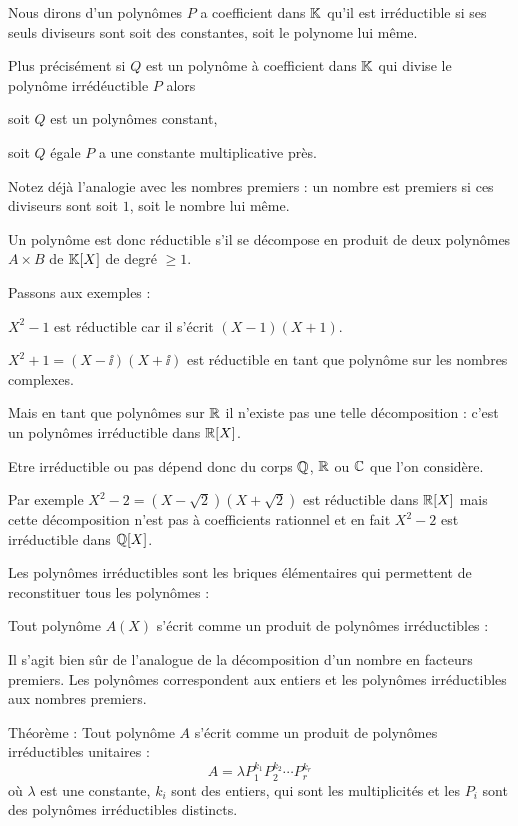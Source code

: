 Nous dirons d'un polynômes $P$ a coefficient dans $\mathbb{K}$ qu'il est irréductible 
si ses seuls diviseurs sont soit des constantes, soit le polynome lui même.

Plus précisément si $Q$ est un polynôme à coefficient dans $\mathbb{K}$ qui divise le polynôme irrédéuctible $P$
alors

soit $Q$ est un polynômes constant,

soit $Q$ égale $P$ a une constante multiplicative près.


Notez déjà l'analogie avec les nombres premiers :
un nombre est premiers si ces diviseurs sont soit $1$, soit le nombre lui même.


\change

Un polynôme est donc réductible s'il se décompose en produit de deux 
 polynômes $A \times B$ de $\mathbb{K}[X]$ de degré $\ge 1$.
 
 
\change

Passons aux exemples :

$X^2-1$ est réductible car il s'écrit $(X-1)(X+1)$.


\change

$X^2+1=(X-\ii)(X+\ii)$ est réductible en tant que polynôme sur les nombres complexes.

Mais en tant que polynômes sur $\mathbb{R}$ il n'existe pas une telle décomposition : c'est un polynômes irréductible
dans $\mathbb{R}[X]$.


Etre irréductible ou pas dépend donc du corps $\mathbb{Q}$, $\mathbb{R}$ ou $\mathbb{C}$ que l'on considère.

\change

Par exemple 
$X^2-2=(X-\sqrt2)(X+\sqrt2)$ est réductible dans $\mathbb{R}[X]$ mais cette décomposition n'est pas à coefficients rationnel et en fait
$X^2-2$ est irréductible dans $\mathbb{Q}[X]$.  



\diapo

Les polynômes irréductibles sont les briques élémentaires qui permettent de reconstituer
tous les polynômes :


Tout polynôme $A(X)$ s'écrit comme un produit de polynômes
irréductibles :

Il s'agit bien sûr de l'analogue de la décomposition d'un nombre en facteurs premiers.
Les polynômes correspondent aux entiers et les polynômes irréductibles aux nombres premiers.

Théorème : 
Tout polynôme $A$ s'écrit comme un produit de polynômes
irréductibles unitaires :
$$A= \lambda  P_1^{k_1}P_2^{k_2} \cdots P_r^{k_r}$$
 où $\lambda$ est une constante, $k_i$ sont des entiers, qui sont les multiplicités
et les $P_i$ sont des polynômes irréductibles distincts.


